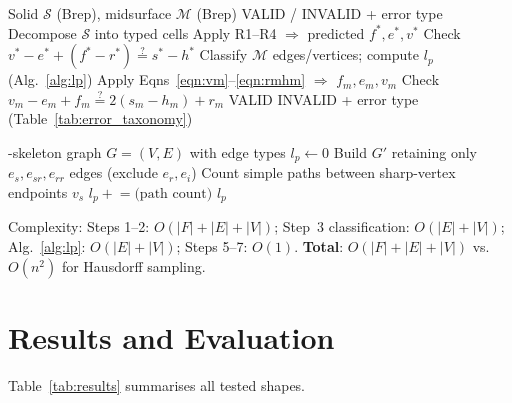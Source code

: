 \documentclass[journal,twocolumn,10pt]{IEEEtran}
\begin{document}
\begin{algorithm}[ht]
\caption{Topological Validation of Midsurface}\label{alg:main}
\begin{algorithmic}[1]
\Require Solid $\mathcal{S}$ (Brep), midsurface $\mathcal{M}$ (Brep)
\Ensure VALID / INVALID + error type
\State Decompose $\mathcal{S}$ into typed cells
\State Apply R1--R4 $\Rightarrow$ predicted $f^*,e^*,v^*$
\State Check $v^*-e^*+(f^*-r^*)\stackrel{?}{=}s^*-h^*$
\State Classify $\mathcal{M}$ edges/vertices; compute $l_p$ (Alg.~\ref{alg:lp})
\State Apply Eqns~\eqref{eqn:vm}--\eqref{eqn:rmhm} $\Rightarrow$ $f_m,e_m,v_m$
\State Check $v_m-e_m+f_m\stackrel{?}{=}2(s_m-h_m)+r_m$
 \Return VALID
\Else{} \Return INVALID + error type (Table~\ref{tab:error_taxonomy})
\EndIf
\end{algorithmic}
\end{algorithm}

\begin{algorithm}[ht]
\caption{Compute $l_p$ (capping-face path count)}\label{alg:lp}
\begin{algorithmic}[1]
-skeleton graph $G=(V,E)$ with edge types
\State $l_p\leftarrow0$
\State Build $G'$ retaining only $e_s,e_{sr},e_{rr}$ edges (exclude $e_r,e_i$)
  \State Count simple paths between sharp-vertex endpoints $v_s$
  \State $l_p\mathrel{+}=\text{(path count)}$
\EndFor
\State \Return $l_p$
\end{algorithmic}
\end{algorithm}

Complexity: Steps 1--2: $O(|F|+|E|+|V|)$; Step~3 classification:
$O(|E|+|V|)$; Alg.~\ref{alg:lp}: $O(|E|+|V|)$; Steps 5--7: $O(1)$.
\textbf{Total}: $O(|F|+|E|+|V|)$ vs.\ $O(n^2)$ for Hausdorff sampling.

\section{Results and Evaluation}\label{sec:results}

Table~\ref{tab:results} summarises all tested shapes.
\end{document}

